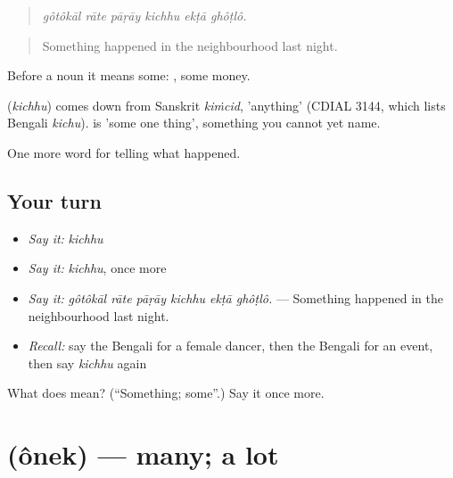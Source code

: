 \begin{quote}
     
\end{quote}

\begin{quote}
\emph{gôtôkāl rāte pāṛāy kichhu ekṭā ghôṭlô.}
\end{quote}

\begin{quote}
Something happened in the neighbourhood last night.
\end{quote}

Before a noun it means some:  , some money.

\begin{cousinweb}
\textbf{} (\emph{kichhu}) comes down from Sanskrit \emph{kiṁcid}, 'anything' (CDIAL 3144, which lists Bengali \emph{kichu}).   is 'some one thing', something you cannot yet name.
\end{cousinweb}

\begin{grammarlens}[title={What you've built}]
One more word for telling what happened.
\end{grammarlens}

\subsection*{Your turn}
\begin{itemize}
\raggedright
  \item \emph{Say it:} \emph{kichhu}
  \item \emph{Say it:} \emph{kichhu}, once more
  \item \emph{Say it:} \emph{gôtôkāl rāte pāṛāy kichhu ekṭā ghôṭlô.} — Something happened in the neighbourhood last night.
  \item \emph{Recall:} say the Bengali for a female dancer, then the Bengali for an event, then say \emph{kichhu} again
\end{itemize}

\begin{tcolorbox}[breakable,colback=teal!4,colframe=teal!35!black,title={Before you move on}]
What does  mean? (\textquotedblleft{}Something; some\textquotedblright{}.) Say it once more.
\end{tcolorbox}
\section[\texorpdfstring{\bn{অনেক} (ônek)}{অনেক (ônek)}]{ (ônek) — many; a lot}

